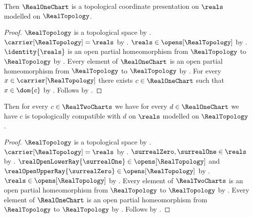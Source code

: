 \begin{classification}\label{real_one_chart_presentation}
    Then $\RealOneChart$ is a topological coordinate presentation on $\reals$
        modelled on $\RealTopology$.
\end{classification}
\begin{proof}
    $\RealTopology$ is a topological space by .
    $\carrier[\RealTopology]=\reals$ by .
    $\reals\in\opens[\RealTopology]$ by .
    $\identity{\reals}$ is an open partial homeomorphism from $\RealTopology$
        to $\RealTopology$ by .
    Every element of $\RealOneChart$ is an open partial homeomorphism
        from $\RealTopology$ to $\RealTopology$ by .
    For every $x\in\carrier[\RealTopology]$ there exists $c\in\RealOneChart$
        such that $x\in\dom{c}$ by .
    Follows by .
\end{proof}

\begin{theorem}\label{real_presentations_cross_compatible}
    Then for every $c\in\RealTwoCharts$ we have for every $d\in\RealOneChart$ we have
        $c$ is topologically compatible with $d$ on $\reals$ modelled on $\RealTopology$.
\end{theorem}
\begin{proof}
    $\RealTopology$ is a topological space by .
    $\carrier[\RealTopology]=\reals$ by .
    $\surrealZero,\surrealOne\in\reals$ by
        .
    $\realOpenLowerRay{\surrealOne}\in\opens[\RealTopology]$ and
        $\realOpenUpperRay{\surrealZero}\in\opens[\RealTopology]$ by
        .
    $\reals\in\opens[\RealTopology]$ by .
    Every element of $\RealTwoCharts$ is an open partial homeomorphism
        from $\RealTopology$ to $\RealTopology$ by
        .
    Every element of $\RealOneChart$ is an open partial homeomorphism
        from $\RealTopology$ to $\RealTopology$ by
        .
    Follows by .
\end{proof}

